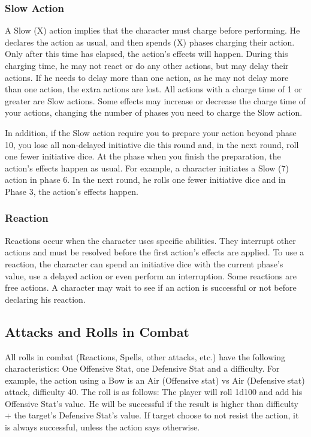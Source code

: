 \begin{multicols}{2}
\subsubsection{Slow Action}
A Slow (X) action implies that the character must charge before performing. He declares the action as usual, and then spends (X) phases charging their action. Only after this time has elapsed, the action’s effects will happen. During this charging time, he may not react or do any other actions, but may delay their actions. If he needs to delay more than one action, as he may not delay more than one action, the extra actions are lost. All actions with a charge time of 1 or greater are Slow actions. Some effects may increase or decrease the charge time of your actions, changing the number of phases you need to charge the Slow action.

In addition, if the Slow action require you to prepare your action beyond phase 10, you lose all non-delayed initiative die this round and, in the next round, roll one fewer initiative dice. At the phase when you finish the preparation, the action’s effects happen as usual. For example, a character initiates a Slow (7) action in phase 6. In the next round, he rolls one fewer initiative dice and in Phase 3, the action’s effects happen.

\subsubsection{Reaction}
Reactions occur when the character uses specific abilities. They interrupt other actions and must be resolved before the first action’s effects are applied. To use a reaction, the character can spend an initiative dice with the current phase’s value, use a delayed action or even perform an interruption. Some reactions are free actions. A character may wait to see if an action is successful or not before declaring his reaction.

\subsection{Attacks and Rolls in Combat}\label{subsec:attacks}
All rolls in combat (Reactions, Spells, other attacks, etc.) have the following characteristics: One Offensive Stat, one Defensive Stat and a difficulty. For example, the  action using a Bow is an Air (Offensive stat) vs Air (Defensive stat) attack, difficulty 40. The roll is as follows: The player will roll 1d100 and add his Offensive Stat’s value. He will be successful if the result is higher than difficulty + the target’s Defensive Stat’s value. If target choose to not resist the action, it is always successful, unless the action says otherwise.


\end{multicols}
